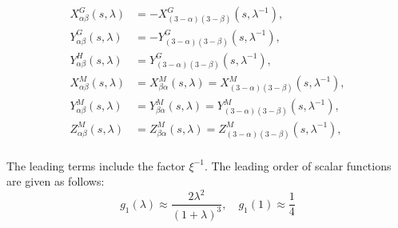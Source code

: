 \documentclass[12pt]{article}
\begin{document}
\begin{align}
 X_{\alpha\beta}^{G} (s,\lambda)
& =
- X_{(3-\alpha)(3-\beta)}^{G} (s,\lambda^{-1}), \\
 Y_{\alpha\beta}^{G} (s,\lambda)
& =
- Y_{(3-\alpha)(3-\beta)}^{G} (s,\lambda^{-1}), \\
 Y_{\alpha\beta}^{H} (s,\lambda)
& =
 Y_{(3-\alpha)(3-\beta)}^{G} (s,\lambda^{-1}), \\
 X_{\alpha\beta}^{M} (s,\lambda)
& =
 X_{\beta\alpha}^{M} (s,\lambda)
 =
 X_{(3-\alpha)(3-\beta)}^{M} (s,\lambda^{-1}), \\
 Y_{\alpha\beta}^{M} (s,\lambda)
& =
 Y_{\beta\alpha}^{M} (s,\lambda)
 =
 Y_{(3-\alpha)(3-\beta)}^{M} (s,\lambda^{-1}), \\
 Z_{\alpha\beta}^{M} (s,\lambda)
& =
 Z_{\beta\alpha}^{M} (s,\lambda)
 =
 Z_{(3-\alpha)(3-\beta)}^{M} (s,\lambda^{-1}), \\
\end{align}


The leading terms include the factor $\xi^{-1}$.
%
The leading order of scalar functions are given as follows:
%
\begin{equation*}
 g_1 (\lambda)
\approx \frac{2\lambda^2}{(1+\lambda)^3},
\quad  g_1 (1) \approx \frac{1}{4}
\end{equation*}
\end{document}
